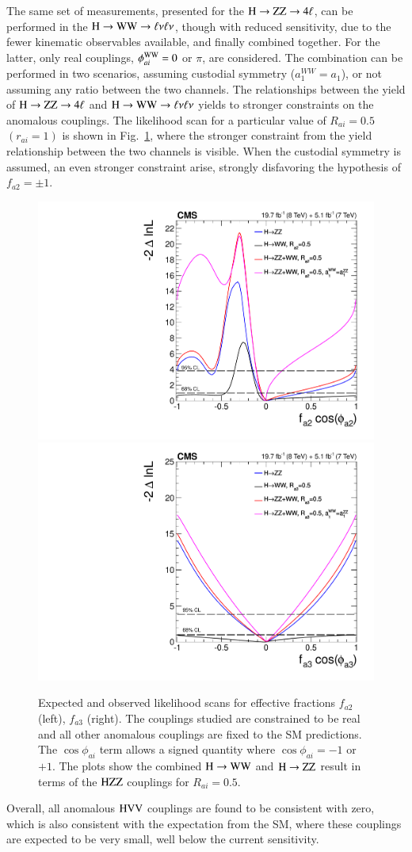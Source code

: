 The same set of measurements, presented for the $\mathrm{H}\to\mathrm{Z}\mathrm{Z}\to4\ell$, can be
performed in the $\mathrm{H}\to\mathrm{W}\mathrm{W}\to\ell\nu\ell\nu$, though with reduced sensitivity, due to
the fewer kinematic observables available, and finally combined
together. For the latter, only real couplings, $\phi_{ai}^{\mathrm{W}\mathrm{W}}=0$
or $\pi$, are considered. The combination can be performed in two
scenarios, assuming custodial symmetry ($a_1^{WW} = a_1$), or not
assuming any ratio between the two channels. The relationships between
the yield of $\mathrm{H}\to\mathrm{Z}\mathrm{Z}\to4\ell$ and $\mathrm{H}\to\mathrm{W}\mathrm{W}\to\ell\nu\ell\nu$ yields to stronger constraints
on the anomalous couplings.  The likelihood scan for a particular
value of $R_{ai}=0.5$ $(r_{ai} = 1)$ is shown in
Fig.~\ref{fig:hwwscans}, where the stronger constraint from the yield
relationship between the two channels is visible. When the custodial
symmetry is assumed, an even stronger constraint arise, strongly
disfavoring the hypothesis of $f_{a2}=\pm1$.
%

\begin{figure}[!htbp]
  \begin{center} 
    \includegraphics[width=0.49\linewidth]{figures/fa2_combine_ww.pdf}
    \includegraphics[width=0.49\linewidth]{figures/fa3_combine_ww.pdf}
    \caption{ Expected and observed likelihood scans for effective
      fractions $f_{a2}$ (left), $f_{a3}$ (right).  The couplings
      studied are constrained to be real and all other anomalous
      couplings are fixed to the SM predictions.  The $\cos\phi_{ai}$
      term allows a signed quantity where $\cos\phi_{ai}=-1$ or $+1$.
      The plots show the combined $\mathrm{H}\to\mathrm{W}\mathrm{W}$ and $\mathrm{H}\to\mathrm{Z}\mathrm{Z}$
      result in terms of the $\mathrm{H}\mathrm{Z}\mathrm{Z}$ couplings for $R_{ai} = 0.5$.
      \label{fig:hwwscans}
      } \end{center}
\end{figure}

%
Overall, all anomalous $\mathrm{H}\mathrm{V}\mathrm{V}$ couplings are found to be consistent
with zero, which is also consistent with the expectation from the SM,
where these couplings are expected to be very small, well below the
current sensitivity.
